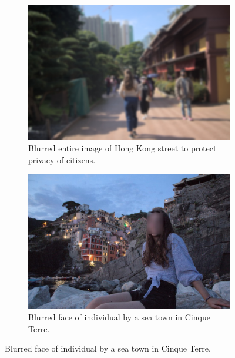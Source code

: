 \begin{figure}[H]
    \centering
    \begin{subfigure}{0.46\textwidth}
        \centering
        \includegraphics[width=\textwidth]{Images/Obfuscation/blurred_street.jpg}
        \caption{\centering Blurred entire image of Hong Kong street to protect privacy of citizens.}
    \end{subfigure}
    \hfill
    \begin{subfigure}{0.46\textwidth}
        \centering
        \includegraphics[width=1\textwidth]{Images/Obfuscation/face_blur.jpg}
        \caption{\centering Blurred face of individual by a sea town in Cinque Terre.}
    \end{subfigure}
    \newline


\end{figure}
